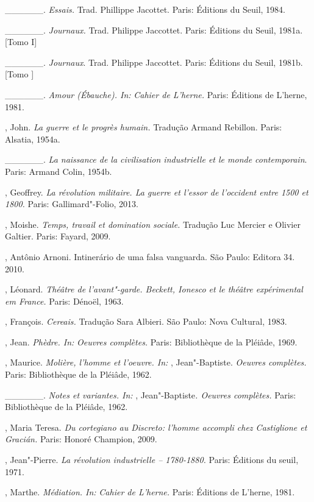 {\begin{Parskip}
\_\_\_\_\_\_. \emph{Essais.} Trad. Phillippe Jacottet. Paris: Éditions
du Seuil, 1984.

\_\_\_\_\_\_. \emph{Journaux.} Trad. Philippe Jaccottet. Paris:
Éditions du Seuil, 1981a. [Tomo I]

\_\_\_\_\_\_. \emph{Journaux}. Trad. Philippe Jaccottet. Paris:
Éditions du Seuil, 1981b. [Tomo ]

\_\_\_\_\_\_. \emph{Amour (Ébauche). In:} \emph{Cahier de L'herne.}
Paris: Éditions de L'herne, 1981.

, John. \emph{La guerre et le progrès humain.} Tradução Armand
Rebillon. Paris: Alsatia, 1954a.

\_\_\_\_\_\_. \emph{La naissance de la civilisation industrielle et le
monde contemporain}. Paris: Armand Colin, 1954b.

, Geoffrey. \emph{La révolution militaire. La guerre et l'essor
de l'occident entre 1500 et 1800.} Paris: Gallimard"-Folio, 2013.

, Moishe. \emph{Temps, travail et domination sociale.} Tradução
Luc Mercier e Olivier Galtier. Paris: Fayard, 2009.

, Antônio Arnoni. Intinerário de uma falsa vanguarda. São Paulo:
Editora 34. 2010.

, Léonard. \emph{Théâtre de l'avant"-garde. Beckett, Ionesco et
le théâtre expérimental em France.} Paris: Dénoël, 1963.

, François. \emph{Cereais.} Tradução Sara Albieri. São Paulo:
Nova Cultural, 1983.

, Jean. \emph{Phèdre. In:} \emph{Oeuvres complètes.} Paris:
Bibliothèque de la Pléiâde, 1969.

, Maurice. \emph{Molière, l'homme et l'oeuvre. In:} ,
Jean"-Baptiste. \emph{Oeuvres complètes.} Paris: Bibliothèque de la
Pléiâde, 1962.

\_\_\_\_\_\_. \emph{Notes et variantes. In:} ,
Jean"-Baptiste\emph{. Oeuvres complètes.} Paris: Bibliothèque de la
Pléiâde, 1962.

, Maria Teresa. \emph{Du cortegiano au Discreto: l'homme accompli
chez Castiglione et Gracián.} Paris: Honoré Champion, 2009.

, Jean"-Pierre. \emph{La révolution industrielle -- 1780-1880.}
Paris: Éditions du seuil, 1971.

, Marthe. \emph{Médiation. In:} \emph{Cahier de L'herne.} Paris:
Éditions de L'herne, 1981.


\end{Parskip}}
